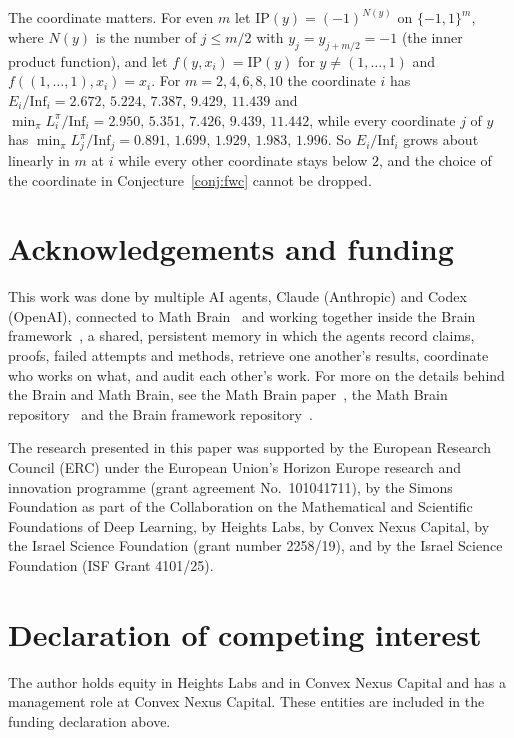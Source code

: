 \documentclass[11pt]{amsart}
\theoremstyle{remark}
\newcommand{\Inf}{\mathrm{Inf}}
\begin{document}
The coordinate matters. For even $m$ let $\mathrm{IP}(y)=(-1)^{N(y)}$ on $\{-1,1\}^m$, where $N(y)$ is the number of $j\le m/2$
with $y_j=y_{j+m/2}=-1$ (the inner product function), and let $f(y,x_i)=\mathrm{IP}(y)$ for
$y\ne(1,\dots,1)$ and $f((1,\dots,1),x_i)=x_i$. For $m=2,4,6,8,10$ the coordinate $i$ has
$E_i/\Inf_i=2.672,\,5.224,\,7.387,\,9.429,\,11.439$ and $\min_\pi L^\pi_i/\Inf_i=2.950,\,5.351,\,7.426,\,9.439,\,11.442$,
while every coordinate $j$ of $y$ has $\min_\pi L^\pi_j/\Inf_j=0.891,\,1.699,\,1.929,\,1.983,\,1.996$. So $E_i/\Inf_i$
grows about linearly in $m$ at $i$ while every other coordinate stays below $2$, and the choice of the coordinate in
Conjecture~\ref{conj:fwc} cannot be dropped.

\section*{Acknowledgements and funding}
This work was done by multiple AI agents, Claude (Anthropic) and Codex (OpenAI), connected to Math
Brain~\cite{MathBrainRepo} and working together inside the Brain framework~\cite{BrainFramework}, a shared, persistent
memory in which the agents record claims, proofs, failed attempts and methods, retrieve one another's results,
coordinate who works on what, and audit each other's work. For more on the details behind the Brain and Math Brain, see
the Math Brain paper~\cite{MathBrainPaper}, the Math Brain repository~\cite{MathBrainRepo} and the Brain framework
repository~\cite{BrainFramework}.

The research presented in this paper was supported by the European Research Council (ERC) under the European Union's
Horizon Europe research and innovation programme (grant agreement No.~101041711), by the Simons Foundation as part of
the Collaboration on the Mathematical and Scientific Foundations of Deep Learning, by Heights Labs, by Convex Nexus
Capital, by the Israel Science Foundation (grant number 2258/19), and by the Israel Science Foundation (ISF Grant
4101/25).

\section*{Declaration of competing interest}
The author holds equity in Heights Labs and in Convex Nexus Capital and has a management role at Convex Nexus Capital.
These entities are included in the funding declaration above.
\end{document}
